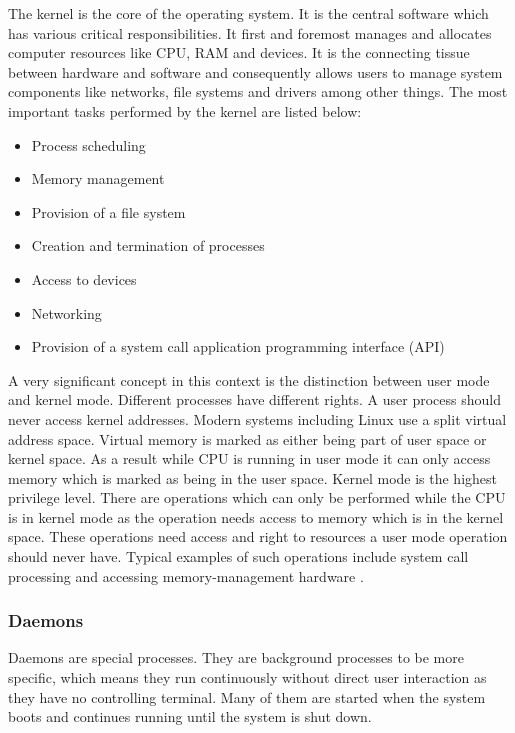 The kernel is the core of the operating system. It is the central software which has various critical responsibilities. It first and foremost manages and allocates computer resources like CPU, RAM and devices. It is the connecting tissue between hardware and software and consequently allows users to manage system components like networks, file systems and drivers among other things. \newline\newline The most important tasks performed by the kernel are listed below:

\begin{itemize}
	\item Process scheduling
	\item Memory management
	\item Provision of a file system
	\item Creation and termination of processes
	\item Access to devices
	\item Networking
	\item Provision of a system call application programming interface (API)
\end{itemize}

A very significant concept in this context is the distinction between user mode and kernel mode. Different processes have different rights. A user process should never access kernel addresses. Modern systems including Linux use a split virtual address space. Virtual memory is marked as either being part of user space or kernel space. As a result while CPU is running in user mode it can only access memory which is marked as being in the user space. \newline\newline  Kernel mode is the highest privilege level. There are operations which can only be performed while the CPU is in kernel mode as the operation needs access to memory which is in the kernel space. These operations need access and right to resources a user mode operation should never have. Typical examples of such operations include system call processing and accessing memory-management hardware \cite{kerrisk2010}.

\subsubsection{Daemons}

Daemons are special processes. They are background processes to be more specific, which means they run continuously without direct user interaction as they have no controlling terminal. Many of them are started when the system boots and continues running until the system is shut down\cite{kerrisk2010}.

